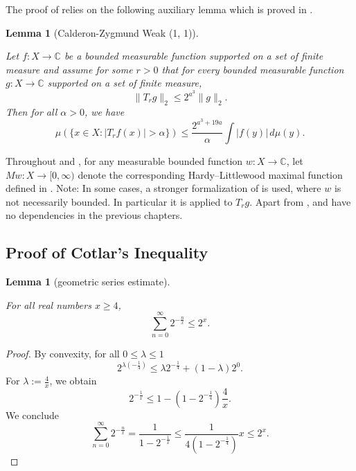 \documentclass[10pt,a4paper]{article}
\theoremstyle{plain}
\newtheorem{lemma}[theorem]{Lemma}
\theoremstyle{definition}
\numberwithin{equation}{subsection}
\newcommand{\lean}[1]{}
\newcommand{\uses}[1]{}
\newcommand{\leanok}{}
\def\C{\mathbb{C}}
\begin{document}
The proof of  relies on the following auxiliary lemma which is proved in .
\begin{lemma}[Calderon-Zygmund Weak (1, 1)]
    \label{calderon-zygmund-weak-1-1}
    \leanok
    \lean{czOperator_weak_1_1}
    \uses{Calderon-Zygmund-decomposition,estimate-bad,estimate-good}
    Let $f:X\to\C$ be a bounded measurable function supported on a set of finite measure and assume for some $r>0$ that for every bounded measurable function $g:X\to\C$ supported on a set of finite measure,
    \begin{equation}
        \label{eq-strong-2-2-assumption}
        \|T_rg\|_{2}\le 2^{a^3} \|g\|_2.
    \end{equation}
    Then for all $\alpha>0$, we have
    \begin{equation}
        \label{eq-weak-1-1}
        \mu\left(\{x\in X: |T_r f(x)|>\alpha\}\right)\le \frac{2^{a^3 + 19a}}{\alpha} \int |f(y)|\, d\mu(y).
    \end{equation}
\end{lemma}
Throughout  and , for any measurable bounded function $w: X \to \C$, let $Mw: X \to [0, \infty)$ denote the corresponding Hardy--Littlewood maximal function defined in .
Note: In some cases, a stronger formalization of  is used, where $w$ is not necessarily bounded. In particular it is applied to $T_rg$.
Apart from ,  and  have no dependencies in the previous chapters.



\subsection{Proof of Cotlar's Inequality}
\label{subsec-cotlar}

\begin{lemma}[geometric series estimate]
    \label{geometric-series-estimate}
    \leanok
    \lean{geometric_series_estimate}
    For all real numbers $x\ge 4$,
    \begin{equation*}
        \sum_{n=0}^\infty 2^{-\frac{n}{x}} \le 2^x.
    \end{equation*}
\end{lemma}
\begin{proof}
    \leanok
    By convexity, for all $0\le\lambda\le1$
    \begin{equation*}
        2^{\lambda(-\frac{1}{4})} \le \lambda 2^{-\frac{1}{4}} + (1-\lambda)2^0.
    \end{equation*}
    For $\lambda:=\frac{4}{x}$, we obtain
    \begin{equation*}
        2^{-\frac 1 x} \le 1 - (1-2^{-\frac 1 4}) \frac{4}{x}.
    \end{equation*}
    We conclude
    \begin{equation*}
        \sum_{n=0}^\infty 2^{-\frac{n}{x}} = \frac{1}{1-2^{-\frac 1 x}} \le \frac{1}{4(1-2^{-\frac 1 4})} x \le 2^x.
    \end{equation*}
\end{proof}
\end{document}
